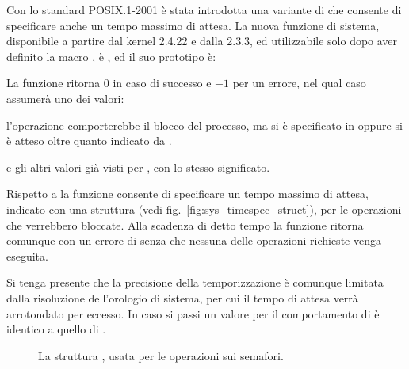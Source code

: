 Con lo standard POSIX.1-2001 è stata introdotta una variante di 
che consente di specificare anche un tempo massimo di attesa. La nuova
funzione di sistema, disponibile a partire dal kernel 2.4.22 e dalla
 2.3.3, ed utilizzabile solo dopo aver definito la macro
, è , ed il suo prototipo è:

\begin{funcproto}{
}

{La funzione ritorna $0$ in caso di successo e $-1$ per un errore, nel qual
  caso  assumerà uno dei valori: 
  \begin{errlist}
  \item[\errcode{EAGAIN}] l'operazione comporterebbe il blocco del processo,
    ma si è specificato  in  oppure si è
    atteso oltre quanto indicato da .
  \end{errlist}
  e gli altri valori già visti per , con lo stesso significato.}
\end{funcproto}

Rispetto a  la funzione consente di specificare un tempo massimo
di attesa, indicato con una struttura  (vedi
fig.~\ref{fig:sys_timespec_struct}), per le operazioni che verrebbero
bloccate. Alla scadenza di detto tempo la funzione ritorna comunque con un
errore di  senza che nessuna delle operazioni richieste venga
eseguita. 

Si tenga presente che la precisione della temporizzazione è comunque limitata
dalla risoluzione dell'orologio di sistema, per cui il tempo di attesa verrà
arrotondato per eccesso. In caso si passi un valore 
per  il comportamento di  è identico a quello
di .


\begin{figure}[!htb]
  \footnotesize \centering
  \begin{minipage}[c]{.80\textwidth}
  \end{minipage} 
  \normalsize 
  \caption{La struttura , usata per le operazioni sui
    semafori.}
  \label{fig:ipc_sembuf}
\end{figure}

